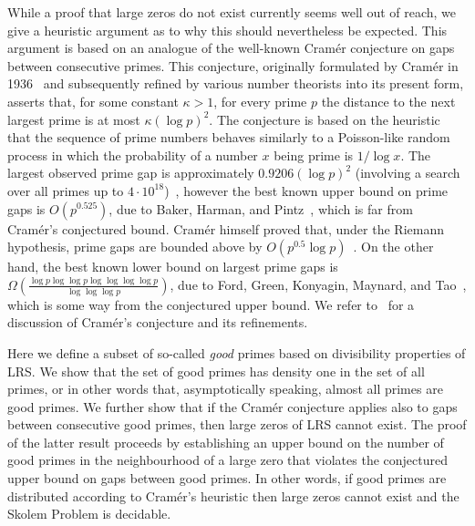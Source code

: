 \documentclass[preprint,12pt]{elsarticle}
\begin{document}
While a proof that large zeros do not exist currently seems well out
of reach, we give a heuristic argument as to why this should
nevertheless be expected.  This argument is based on an analogue of
the well-known Cram\'{e}r conjecture on gaps between consecutive
primes.  This conjecture, originally formulated by Cram\'er in
1936~\cite{cramer1936} and subsequently refined by various number
theorists into its present form, asserts that, for some constant
$\kappa>1$, for every prime $p$ the distance to the next largest prime
is at most $\kappa (\log p)^2$.  The conjecture is based on the
heuristic that the sequence of prime numbers behaves similarly to a
Poisson-like random process in which the probability of a number $x$
being prime is $1/\log x$.  The largest observed prime gap is approximately
$0.9206 (\log p)^2$ (involving a search over all primes up to $4 \cdot
10^{18}$)~\cite{OHP14}, however the best known
upper bound on prime gaps is $O(p^{0.525})$, due to Baker, Harman, and
Pintz~\cite{BakerHarmanPintz2001}, which is far from Cram\'{e}r's
conjectured bound. Cram\'er himself proved that, under the Riemann
hypothesis, prime gaps are bounded above by
$O(p^{0.5}\log p)$~\cite{cramer1936}.  On the other hand, the best
known lower bound on largest prime gaps is
$\Omega\left( \frac{\log p \log \log p \log \log \log \log p}{\log
    \log \log p} \right)$, due to Ford, Green, Konyagin, Maynard, and Tao~\cite{ford18},
which is some way from the conjectured upper bound. We refer to~\cite{Granville1995} for
a discussion of Cram\'{e}r's conjecture and its refinements.

Here we define a subset of so-called \emph{good} primes based on
divisibility properties of LRS\@.  We show that the set of good primes
has density one in the set of all primes, or in other words that,
asymptotically speaking, almost all primes are good primes.  We
further show that if the Cram\'{e}r conjecture applies also to gaps
between consecutive good primes, then large zeros of LRS cannot
exist. The proof of the latter result 
proceeds by establishing an upper bound on the number of good primes
in the neighbourhood of a large zero that violates the conjectured
upper bound on gaps between good primes.  In other words, if good
primes are distributed according to Cram\'{e}r's heuristic then large
zeros cannot exist and the Skolem Problem is decidable.
  
\end{document}
